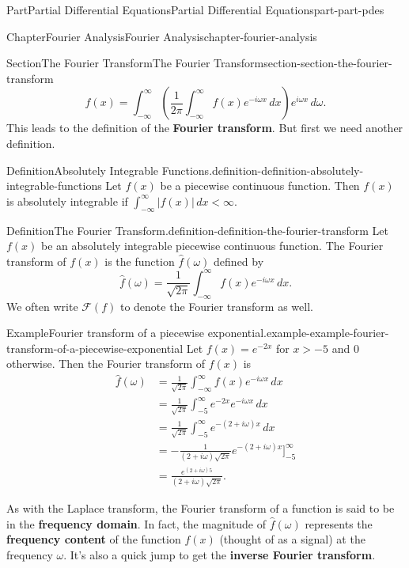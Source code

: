 \documentclass[twoside,10pt,]{book}
\newcommand{\terminology}[1]{\textbf{#1}}
\numberwithin{equation}{part}
\newcommand{\lt}{<}
\newcommand{\amp}{&}
\begin{document}
\begin{partptx}{Part}{Partial Differential Equations}{}{Partial Differential Equations}{}{}{part-part-pdes}
\begin{chapterptx}{Chapter}{Fourier Analysis}{}{Fourier Analysis}{}{}{chapter-fourier-analysis}
\begin{sectionptx}{Section}{The Fourier Transform}{}{The Fourier Transform}{}{}{section-section-the-fourier-transform}
\begin{equation*}
f(x) = \int_{-\infty}^{\infty}\left(\frac{1}{2\pi}\int_{-\infty}^{\infty}f(x)e^{-i\omega x}\,dx\right)e^{i\omega x}\,d\omega.
\end{equation*}
This leads to the definition of the \terminology{Fourier transform}. But first we need another definition.%
\begin{definition}{Definition}{Absolutely Integrable Functions.}{definition-definition-absolutely-integrable-functions}%
%
Let \(f(x)\) be a piecewise continuous function. Then \(f(x)\) is absolutely integrable if \(\int_{-\infty}^{\infty}|f(x)|\,dx \lt \infty.\)%
\end{definition}
\begin{definition}{Definition}{The Fourier Transform.}{definition-definition-the-fourier-transform}%
%
Let \(f(x)\) be an absolutely integrable piecewise continuous function. The Fourier transform of \(f(x)\) is the function \(\hat{f}(\omega)\) defined by%
\begin{equation*}
\hat{f}(\omega) = \frac{1}{\sqrt{2\pi}}\int_{-\infty}^{\infty}f(x)e^{-i\omega x}\,dx.
\end{equation*}
We often write \(\mathcal{F}(f)\) to denote the Fourier transform as well.%
\end{definition}
\begin{example}{Example}{Fourier transform of a piecewise exponential.}{example-example-fourier-transform-of-a-piecewise-exponential}%
Let \(f(x) = e^{-2x}\) for \(x>-5\) and \(0\) otherwise. Then the Fourier transform of \(f(x)\) is%
\begin{align*}
\hat{f}(\omega) \amp = \frac{1}{\sqrt{2\pi}}\int_{-\infty}^{\infty}f(x)e^{-i\omega x}\,dx \\
\amp = \frac{1}{\sqrt{2\pi}}\int_{-5}^{\infty}e^{-2x}e^{-i\omega x}\,dx \\
\amp = \frac{1}{\sqrt{2\pi}}\int_{-5}^{\infty}e^{-(2+i\omega)x}\,dx \\
\amp = -\frac{1}{(2+i\omega)\sqrt{2\pi}}e^{-(2+i\omega)x}\Big]_{-5}^{\infty}\\
\amp = \frac{e^{(2+i\omega)5}}{(2+i\omega)\sqrt{2\pi}}. 
\end{align*}
%
\end{example}
As with the Laplace transform, the Fourier transform of a function is said to be in the \terminology{frequency domain}. In fact, the magnitude of \(\hat{f}(\omega)\) represents the \terminology{frequency content} of the function \(f(x)\) (thought of as a signal) at the frequency \(\omega\). It's also a quick jump to get the \terminology{inverse Fourier transform}.%

\end{sectionptx}
\end{chapterptx}
\end{partptx}
\end{document}
